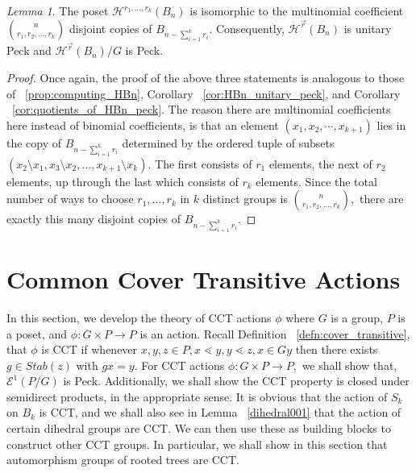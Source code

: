 \documentclass[10 pt]{amsart}
\theoremstyle{plain}
\theoremstyle{definition}
\theoremstyle{remark}
\numberwithin{equation}{section}
\newtheorem{lem}[thm]{Lemma}
\theoremstyle{remark}
\renewcommand{\vec}[1]{\overrightarrow{#1}}
\begin{document}
\begin{lem}
\label{lem:peck_quotients_vector_f}
The poset $\mathcal H^{r_1,\ldots, r_k}(B_n)$ is isomorphic to the multinomial coefficient $\binom n {r_1,r_2,\ldots, r_k}$ disjoint copies of $B_{n- \sum_{i=1}^k r_i}.$ Consequently, $\mathcal H^{\vec r}(B_n)$ is unitary Peck and $\mathcal H^{\vec r}(B_n)/G$ is Peck.
\end{lem}
\begin{proof}
Once again, the proof of the above three statements is analogous to those of ~\ref{prop:computing_HBn}, Corollary ~\ref{cor:HBn_unitary_peck}, and Corollary ~\ref{cor:quotients_of_HBn_peck}. The reason there are multinomial coefficients here instead of binomial coefficients, is that an element $(x_1, x_2, \cdots, x_{k+1})$ lies in the copy of $B_{n -\sum_{i=1}^k r_i}$ determined by the ordered tuple of subsets $(x_2 \setminus x_1,x_3 \setminus x_2, \ldots, x_{k+1} \setminus x_k).$ The first consists of $r_1$ elements, the next of $r_2$ elements, up through the last which consists of $r_k$ elements. Since the total number of ways to choose $r_1,\ldots, r_k$ in $k$ distinct groups is $\binom n {r_1,r_2,\ldots, r_k},$ there are exactly this many disjoint copies of $B_{n- \sum_{i=1}^k r_i}.$
\end{proof}

\section{Common Cover Transitive Actions}
\label{sec:cover_transitive}
In this section, we develop the theory of CCT actions $\phi$ where $G$ is a group, $P$ is a poset, and $\phi:G\times P \rightarrow P$ is an action. Recall Definition ~\ref{defn:cover_transitive}, that $\phi$ is CCT if whenever $x,y,z \in P,x\lessdot y,y\lessdot z,x \in Gy$ then there exists $g \in Stab(z)$ with $gx = y.$ For CCT actions $\phi:G\times P \rightarrow P,$ we shall show that, $\mathcal E^1(P/G)$ is Peck. Additionally, we shall show the CCT property is closed under semidirect products, in the appropriate sense. It is obvious that the action of $S_k$ on $B_k$ is CCT, and we shall also see in Lemma ~\ref{dihedral001} that the action of certain dihedral groups are CCT. We can then use these as building blocks to construct other CCT groups. In particular, we shall show in this section that automorphism groups of rooted trees are CCT.
\end{document}
